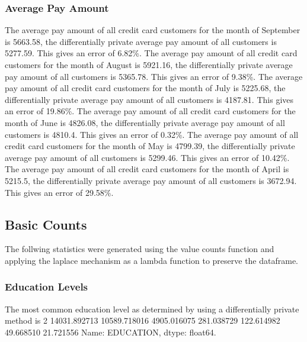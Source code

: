 \documentclass{article}%
\begin{document}
%
\subsubsection{Average Pay Amount}%
\label{ssubsec:AveragePayAmount}%
The average pay amount of all credit card customers for the month of September is 5663.58, the differentially private average pay amount of all customers is 5277.59. This gives an error of 6.82\%.%
The average pay amount of all credit card customers for the month of August is 5921.16, the differentially private average pay amount of all customers is 5365.78. This gives an error of 9.38\%.%
The average pay amount of all credit card customers for the month of July is 5225.68, the differentially private average pay amount of all customers is 4187.81. This gives an error of 19.86\%.%
The average pay amount of all credit card customers for the month of June is 4826.08, the differentially private average pay amount of all customers is 4810.4. This gives an error of 0.32\%.%
The average pay amount of all credit card customers for the month of May is 4799.39, the differentially private average pay amount of all customers is 5299.46. This gives an error of 10.42\%.%
The average pay amount of all credit card customers for the month of April is 5215.5, the differentially private average pay amount of all customers is 3672.94. This gives an error of 29.58\%.

%
\subsection{Basic Counts}%
\label{subsec:BasicCounts}%
The follwing statistics were generated using the value counts function and applying the laplace mechanism as a lambda function to preserve the dataframe.%
\subsubsection{Education Levels}%
\label{ssubsec:EducationLevels}%
The most common education level as determined by using a differentially private method is 2    14031.892713    10589.718016     4905.016075      281.038729      122.614982       49.668510       21.721556\newline%
Name: EDUCATION, dtype: float64.
\end{document}
